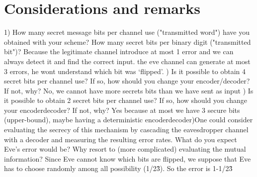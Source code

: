 \documentclass{report}
\begin{document}
\section*{Considerations and remarks}
1) How many secret message bits per channel use ("transmitted word") have you obtained with your
scheme?
How many secret bits per binary digit ("transmitted bit")?  \hfill \break \linebreak
Because the legitimate channel introduce at most 1 error and we can always detect it and find the correct input. the eve channel can generate at most 3 errors, he wont understand which bit was ‘flipped’. \hfill \break  {}) Is it possible to obtain 4 secret bits per channel use?
If so, how should you change your encoder/decoder? If not, why? \hfill \break \linebreak
No, we cannot have more secrets bits than we have sent as input \hfill \break {}) Is it possible to obtain 2 secret bits per channel use?
If so, how should you change your encoder\/decoder? If not, why?  \hfill \break \linebreak
Yes because at most we have 3 secure bits (upper-bound), maybe having a deterministic encoder\/decoder\hfill \break {})One could consider evaluating the secrecy of this mechanism by cascading the eavesdropper channel
with a decoder and measuring the resulting error rates. What do you expect Eve's error would be?
Why resort to (more complicated) evaluating the mutual information? \hfill \break \linebreak
Since Eve cannot know which bits are flipped, we suppose that Eve has to choose randomly among all possibility (1\//2\^3). So the error is 1-1\//2\^3
\end{document}
